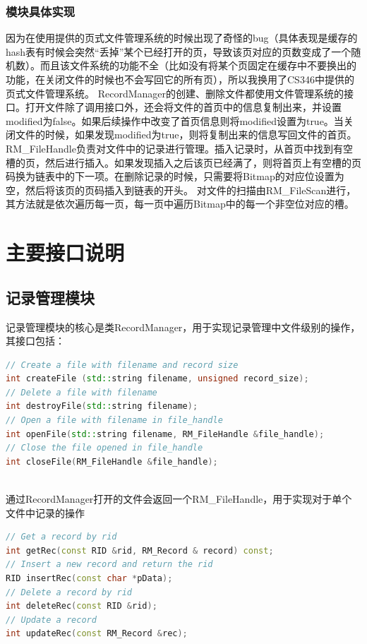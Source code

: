 \documentclass[11pt,UTF8]{report}
\begin{document}
\subsubsection{模块具体实现}

因为在使用提供的页式文件管理系统的时候出现了奇怪的bug（具体表现是缓存的hash表有时候会突然“丢掉”某个已经打开的页，导致该页对应的页数变成了一个随机数）。而且该文件系统的功能不全（比如没有将某个页固定在缓存中不要换出的功能，在关闭文件的时候也不会写回它的所有页），所以我换用了CS346中提供的页式文件管理系统。
RecordManager的创建、删除文件都使用文件管理系统的接口。打开文件除了调用接口外，还会将文件的首页中的信息复制出来，并设置modified为false。如果后续操作中改变了首页信息则将modified设置为true。当关闭文件的时候，如果发现modified为true，则将复制出来的信息写回文件的首页。
RM\_FileHandle负责对文件中的记录进行管理。插入记录时，从首页中找到有空槽的页，然后进行插入。如果发现插入之后该页已经满了，则将首页上有空槽的页码换为链表中的下一项。在删除记录的时候，只需要将Bitmap的对应位设置为空，然后将该页的页码插入到链表的开头。
对文件的扫描由RM\_FileScan进行，其方法就是依次遍历每一页，每一页中遍历Bitmap中的每一个非空位对应的槽。

\section{主要接口说明}
\subsection{记录管理模块}
记录管理模块的核心是类RecordManager，用于实现记录管理中文件级别的操作，其接口包括：
\begin{lstlisting}[language=C++]
// Create a file with filename and record size
int createFile (std::string filename, unsigned record_size);
// Delete a file with filename
int destroyFile(std::string filename);
// Open a file with filename in file_handle
int openFile(std::string filename, RM_FileHandle &file_handle);
// Close the file opened in file_handle
int closeFile(RM_FileHandle &file_handle);
​\end{lstlisting}

通过RecordManager打开的文件会返回一个RM\_FileHandle，用于实现对于单个文件中记录的操作
\begin{lstlisting}[language=C++]
// Get a record by rid
int getRec(const RID &rid, RM_Record & record) const;
// Insert a new record and return the rid
RID insertRec(const char *pData);
// Delete a record by rid
int deleteRec(const RID &rid);
// Update a record
int updateRec(const RM_Record &rec);
\end{lstlisting}
\end{document}
